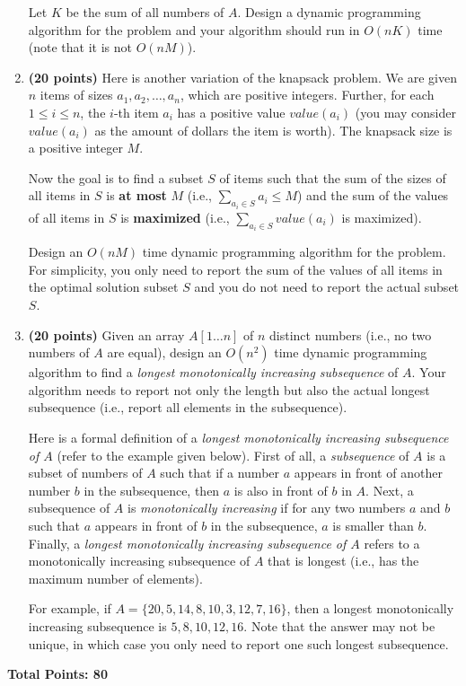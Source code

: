 \documentclass[11pt]{article}
\begin{document}
\begin{enumerate}
Let $K$ be the sum of all numbers of $A$.
Design a dynamic programming algorithm for the problem and your
algorithm should run in $O(nK)$ time (note that it is not $O(nM)$).


\item
 {\bf (20 points)}
Here is another variation of the knapsack problem. We are given $n$ items of sizes
$a_1,a_2,\ldots,a_n$, which are positive integers. Further, for each $1\leq i\leq n$, the $i$-th item $a_i$ has a positive value $value(a_i)$ (you may consider $value(a_i)$ as the amount of dollars the item is worth). The knapsack size is a positive integer $M$.

Now the goal is to find a subset $S$ of items such that the
sum of the sizes of all items in $S$ is {\bf at most} $M$ (i.e., $\sum_{a_i\in S}a_i\leq M$) and the
sum of the values of all items in $S$ is {\bf maximized} (i.e., $\sum_{a_i\in S}value(a_i)$ is maximized).

Design an $O(nM)$ time dynamic programming algorithm for the problem. For simplicity, you only need to report the sum of
the values of all items in the optimal solution subset $S$ and you do not need to report the
actual subset $S$.



\item
{ \bf (20 points)}
Given an array $A[1\ldots n]$ of $n$ distinct numbers (i.e., no two
numbers of $A$ are equal), design an
$O(n^2)$ time dynamic programming algorithm to find a {\em longest
monotonically increasing subsequence} of $A$. Your algorithm needs to
report not only the length but also the actual longest subsequence (i.e., report all elements in the subsequence).

Here is a formal definition of a {\em longest
monotonically increasing subsequence of $A$} (refer to the
example given below). First of all, a {\em subsequence} of $A$ is a subset of numbers of
$A$ such that if a number $a$ appears in front of another number
$b$ in the subsequence, then $a$ is also in front of $b$ in $A$.
Next, a subsequence of $A$ is {\em monotonically increasing} if for any two
numbers $a$ and $b$ such that $a$ appears
in front of $b$ in the subsequence, $a$ is smaller than $b$.
Finally, a {\em longest
monotonically increasing subsequence of $A$} refers to a monotonically
increasing subsequence of $A$ that is longest (i.e., has the maximum number of elements).

For example, if $A=\{20,5,14,8,10,3,12,7,16\}$, then a longest monotonically increasing
subsequence is $5,8,10,12,16$. Note that the answer may not be unique,
in which case you only need to report one such longest subsequence.


\end{enumerate}


{\bf Total Points: 80}
\end{document}
